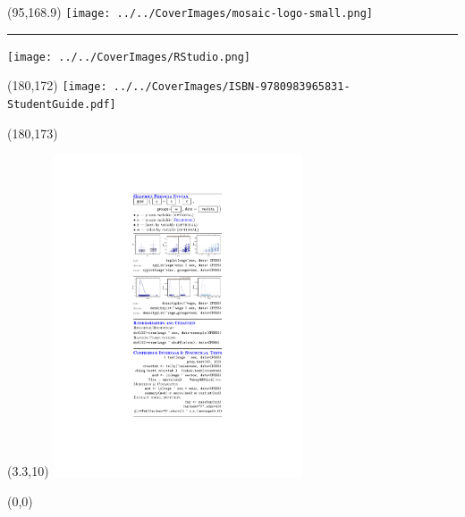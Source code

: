 \documentclass{article}
\begin{document}
\begin{textblock}{1.5}(95,168.9)  
\noindent\texttt{[image: ../../CoverImages/mosaic-logo-small.png]}
\medskip
\noindent\rule{2pt}{0pt}\texttt{[image: ../../CoverImages/RStudio.png]}
\end{textblock}


\begin{textblock}{1.65}(180,172)   %
\noindent\texttt{[image: ../../CoverImages/ISBN-9780983965831-StudentGuide.pdf]}
\end{textblock}
\begin{textblock}{1.65}(180,173)
\noindent{}
\end{textblock}




\begin{textblock}{3}(3.3,10)
\noindent\includegraphics[width=2.9in]{backflap.pdf}
\end{textblock}

\begin{textblock}{3}(0,0)
\noindent{}
\end{textblock}

\end{document}
